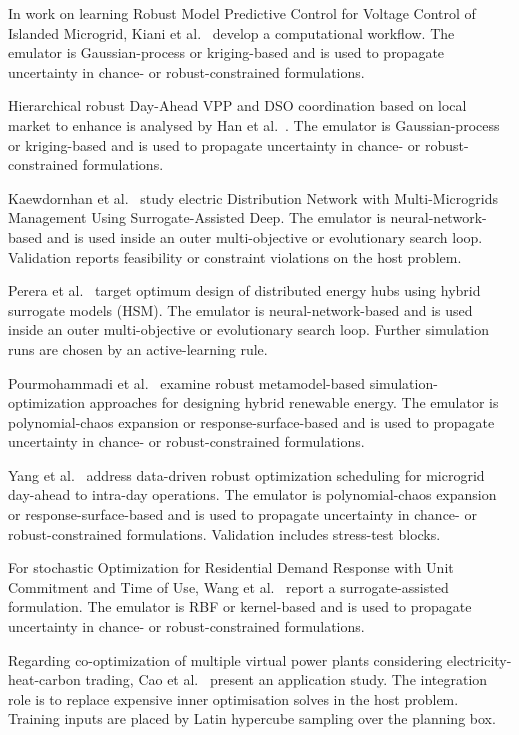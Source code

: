 In work on learning Robust Model Predictive Control for Voltage Control of Islanded Microgrid, Kiani et al.~\cite{Kiani20253021} develop a computational workflow. The emulator is Gaussian-process or kriging-based and is used to propagate uncertainty in chance- or robust-constrained formulations.

Hierarchical robust Day-Ahead VPP and DSO coordination based on local market to enhance is analysed by Han et al.~\cite{Han2024}. The emulator is Gaussian-process or kriging-based and is used to propagate uncertainty in chance- or robust-constrained formulations.

Kaewdornhan et al.~\cite{Kaewdornhan2022130373} study electric Distribution Network with Multi-Microgrids Management Using Surrogate-Assisted Deep. The emulator is neural-network-based and is used inside an outer multi-objective or evolutionary search loop. Validation reports feasibility or constraint violations on the host problem.

Perera et al.~\cite{Perera2017187} target optimum design of distributed energy hubs using hybrid surrogate models (HSM). The emulator is neural-network-based and is used inside an outer multi-objective or evolutionary search loop. Further simulation runs are chosen by an active-learning rule.

Pourmohammadi et al.~\cite{Pourmohammadi2023} examine robust metamodel-based simulation-optimization approaches for designing hybrid renewable energy. The emulator is polynomial-chaos expansion or response-surface-based and is used to propagate uncertainty in chance- or robust-constrained formulations.

Yang et al.~\cite{Yang2024__2} address data-driven robust optimization scheduling for microgrid day-ahead to intra-day operations. The emulator is polynomial-chaos expansion or response-surface-based and is used to propagate uncertainty in chance- or robust-constrained formulations. Validation includes stress-test blocks.

For stochastic Optimization for Residential Demand Response with Unit Commitment and Time of Use, Wang et al.~\cite{Wang20211767} report a surrogate-assisted formulation. The emulator is RBF or kernel-based and is used to propagate uncertainty in chance- or robust-constrained formulations.

Regarding co-optimization of multiple virtual power plants considering electricity-heat-carbon trading, Cao et al.~\cite{Cao2023__2} present an application study. The integration role is to replace expensive inner optimisation solves in the host problem. Training inputs are placed by Latin hypercube sampling over the planning box.

